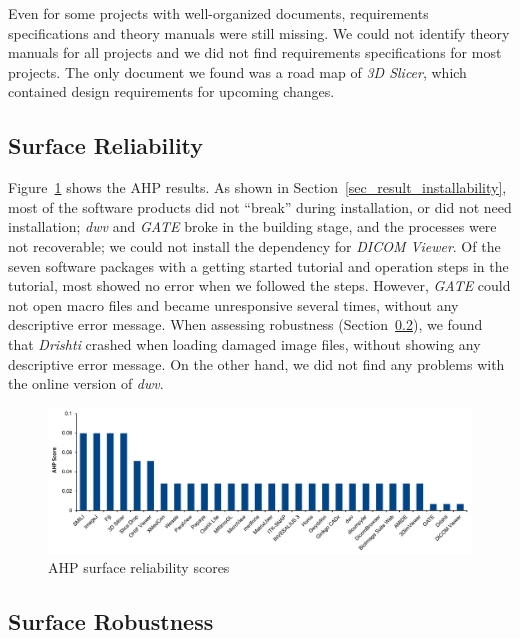 \documentclass[final, 3p, times, authoryear]{elsarticle}
\begin{document}
Even for some projects with well-organized documents, requirements
specifications and theory manuals were still missing.  We could not identify
theory manuals for all projects and we did not find requirements specifications
for most projects. The only document we found was a road map of \textit{3D
Slicer}, which contained design requirements for upcoming changes.

\subsection{Surface Reliability} \label{sec_result_reliability}

Figure~\ref{fg_reliability_scores} shows the AHP results.  As shown in
Section~\ref{sec_result_installability}, most of the software products did not
``break'' during installation, or did not need installation; \textit{dwv} and
\textit{GATE} broke in the building stage, and the processes were not
recoverable; we could not install the dependency for \textit{DICOM Viewer}. Of
the seven software packages with a getting started tutorial and operation steps
in the tutorial, most showed no error when we followed the steps. However,
\textit{GATE} could not open macro files and became unresponsive several times,
without any descriptive error message. When assessing robustness
(Section~\ref{sec_result_robustness}), we found that \textit{Drishti} crashed
when loading damaged image files, without showing any descriptive error message.
On the other hand, we did not find any problems with the online version of
\textit{dwv}.

\begin{figure}[!ht]
\includegraphics[scale=0.48]{figures/reliability_scores.pdf}
\caption{AHP surface reliability scores}
\label{fg_reliability_scores}
\end{figure}

\subsection{Surface Robustness} \label{sec_result_robustness}
\end{document}
